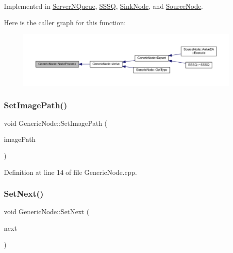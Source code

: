 Implemented in \hyperlink{class_server_n_queue_adbc0e634171f6dc0785f2e49659663f7}{Server\+N\+Queue}, \hyperlink{class_s_s_s_q_a21ff1a4817052985747b6df51bf5d643}{S\+S\+SQ}, \hyperlink{class_sink_node_a5f3fe2c195c3bb154f27bdf3ae27dd27}{Sink\+Node}, and \hyperlink{class_source_node_a666a65bd2424a8f56d8f08260c09c0b4}{Source\+Node}.

Here is the caller graph for this function\+:
\nopagebreak
\begin{figure}[H]
\begin{center}
\leavevmode
\includegraphics[width=350pt]{class_generic_node_ae942258a57f211072d179da470579add_icgraph}
\end{center}
\end{figure}
\mbox{\label{class_generic_node_ad309248ab0074f07f329418c0fa996ed}} 
\subsubsection{\texorpdfstring{Set\+Image\+Path()}{SetImagePath()}}
{\footnotesize\ttfamily void Generic\+Node\+::\+Set\+Image\+Path (\begin{DoxyParamCaption}\item[{const std\+::string \&}]{image\+Path }\end{DoxyParamCaption})}



Definition at line 14 of file Generic\+Node.\+cpp.

\mbox{\label{class_generic_node_ab627bbdbaaef832b9b79199bac113422}} 
\subsubsection{\texorpdfstring{Set\+Next()}{SetNext()}}
{\footnotesize\ttfamily void Generic\+Node\+::\+Set\+Next (\begin{DoxyParamCaption}\item[{\hyperlink{class_generic_node}{Generic\+Node} $\ast$}]{next }\end{DoxyParamCaption})}




